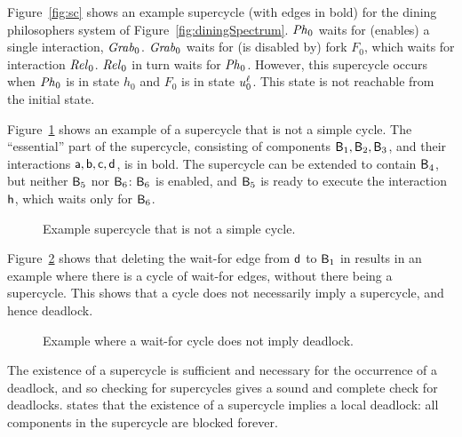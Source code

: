 \begin{figure*}[ht]
  \begin{center}
   \scalebox{0.4}{}
   \caption{Example supercycle for dining philosophers system of Figure~\ref{fig:diningSpectrum}.}
   \label{fig:sc}
  \end{center}
\end{figure*}


Figure~\ref{fig:sc} shows an example supercycle (with edges in bold) for the dining philosophers
system of Figure~\ref{fig:diningSpectrum}.
$\mathit{Ph}_0$ waits for (enables) a single interaction, $\mathit{Grab}_0$. 
$\mathit{Grab}_0$ waits for (is disabled by) fork $F_0$, which waits for interaction $\mathit{Rel}_0$.
$\mathit{Rel}_0$ in turn waits for $\mathit{Ph}_0$. However, this supercycle occurs when $\mathit{Ph}_0$ is in state $h_0$
and $F_0$ is in state $u_0^\ell$. This state is not reachable from the initial state. 


Figure~\ref{fig:SCnotCycle} shows an example of a supercycle that is not a simple cycle.  The ``essential'' part of the supercycle, consisting of
components $\mathsf{B}_1, \mathsf{B}_2, \mathsf{B}_3$, and their interactions $\mathsf{a}, \mathsf{b}, \mathsf{c}, \mathsf{d}$, is in bold.  
The supercycle can be extended to contain $\mathsf{B}_4$, but neither $\mathsf{B}_5$ nor
$\mathsf{B}_6$: $\mathsf{B}_6$ is enabled, and $\mathsf{B}_5$ is ready to execute the interaction $\mathsf{h}$, which waits only for $\mathsf{B}_6$.
%
\begin{figure}[ht]
\begin{center}
\scalebox{0.6}{}
\caption{Example supercycle that is not a simple cycle.}
\label{fig:SCnotCycle}
\end{center}
\end{figure}
%
Figure~\ref{fig:cycleOK} shows that deleting the wait-for edge from $\mathsf{d}$ to $\mathsf{B}_1$ in  results in 
an example where there is
a cycle of wait-for edges, without there being a supercycle. This shows
that a cycle does not necessarily imply a supercycle, and hence
deadlock. 
%
\begin{figure}[ht]
\begin{center}
\scalebox{0.6}{}
\caption{Example where a wait-for cycle does not imply deadlock.}
\label{fig:cycleOK}
\end{center}
\end{figure}


The existence of a supercycle is sufficient and necessary for the occurrence of
a deadlock, and so checking for supercycles gives a sound and complete check for
deadlocks.  
%
 states that the
existence of a supercycle implies a local deadlock: all components in
the supercycle are blocked forever.

